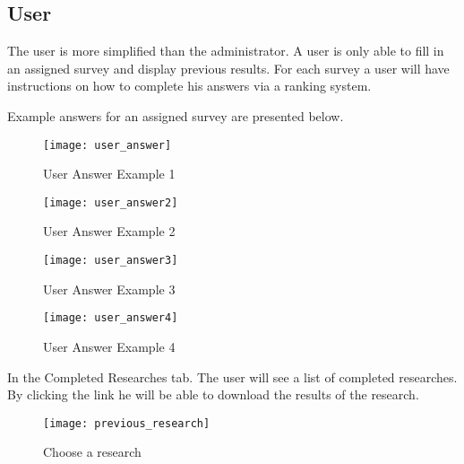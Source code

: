 \documentclass{article}
\begin{document}
\subsection*{User}

The user is more simplified than the administrator. A user is only able to fill in an assigned survey and display previous results. For each survey a user will have instructions on how to complete his answers via a ranking system.

Example answers for an assigned survey are presented below.

\begin{figure}[h!]
\centering
\texttt{[image: user\_answer]}
\caption{User Answer Example 1}
\label{fig:user_answer1}
\end{figure}

\begin{figure}[h!]
\centering
\texttt{[image: user\_answer2]}
\caption{User Answer Example 2}
\label{fig:user_answer2}
\end{figure}

\begin{figure}[h!]
\centering
\texttt{[image: user\_answer3]}
\caption{User Answer Example 3}
\label{fig:user_answer3}
\end{figure}


\begin{figure}[h!]
\centering
\texttt{[image: user\_answer4]}
\caption{User Answer Example 4}
\label{fig:user_answer4}
\end{figure}


In the Completed Researches tab. The user will see a list of completed researches. By clicking the link he will be able to download the results of the research.

\begin{figure}
\centering
\texttt{[image: previous\_research]}
\caption{Choose a research}
\label{fig:previous_research}
\end{figure}









































\end{document}
